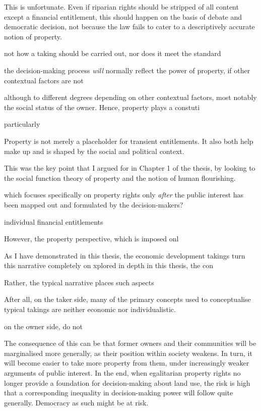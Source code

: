 {{This is unfortunate. Even if riparian rights should be stripped of all content except a financial entitlement, this should happen on the basis of debate and democratic decision, not because the law fails to cater to a descriptively accurate notion of property.


not how a taking should be carried out, nor does it meet the standard 




 the decision-making process {\it will} normally reflect the power of property, if other contextual factors are not 

although to different degrees depending on other contextual factors, most notably the social status of the owner. Hence, property plays a constuti


particularly 


Property is not merely a placeholder for transient entitlements. It also both help make up and is shaped by the social and political context. 


 This was the key point that I argued for in Chapter 1 of the thesis, by looking to the social function theory of property and the notion of human flourishing. 


which focuses specifically on property rights only {\it after} the public interest has been mapped out and formulated by the decision-makers? 



 individual financial entitlements 

However, the property perspective, which is imposed onl

As I have demonstrated in this thesis, the economic development takings turn this narrative completely on  xplored in depth in this thesis, the con

Rather, the typical narrative places such aspects

After all, on the taker side, many of the primary concepts used to conceptualise typical takings are neither economic nor individualistic.

 on the owner side, do not 

The consequence of this can be that former owners and their communities will be marginalised more generally, as their position within society weakens. In turn, it will become easier to take more property from them, under increasingly weaker arguments of public interest. In the end, when egalitarian property rights no longer provide a foundation for decision-making about land use, the risk is high that a corresponding inequality in decision-making power will follow quite generally. Democracy as such might be at risk.

}}
